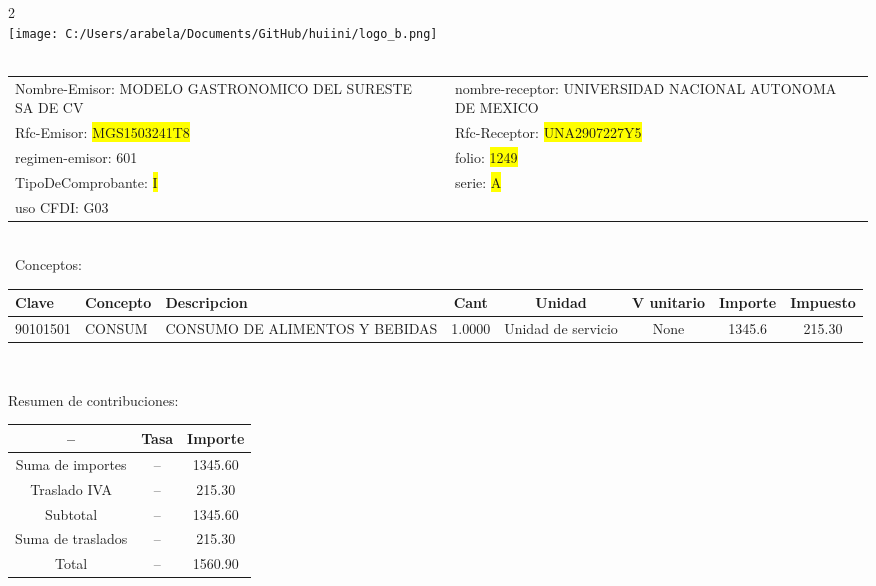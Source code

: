\documentclass{article}
\begin{document}
\hspace{18cm} 2\\
\texttt{[image: C:/Users/arabela/Documents/GitHub/huiini/logo\_b.png]}
\bigskip\\\
\begin{tabular}{p{11cm}p{1cm}p{8cm}}

Nombre-Emisor: MODELO GASTRONOMICO DEL SURESTE SA DE CV && nombre-receptor: UNIVERSIDAD NACIONAL AUTONOMA DE MEXICO\\

Rfc-Emisor: \colorbox{yellow}{ MGS1503241T8 } & & Rfc-Receptor: \colorbox{yellow}{ UNA2907227Y5 }\\

regimen-emisor: 601 & & folio: \colorbox{yellow}{ 1249 }\\

TipoDeComprobante: \colorbox{yellow}{ I } & & serie: \colorbox{yellow}{ A }\\

uso CFDI: G03\\



\end{tabular}
\bigskip\bigskip\bigskip\\\
Conceptos:\\
\begin{tabular}{|p{1.5cm}|p{3.6cm}|p{3.6cm}|c|c|c|c|c|}
\hline
Clave & Concepto & Descripcion & Cant & Unidad & V unitario & Importe & Impuesto \\
\hline

90101501 & CONSUM & CONSUMO DE ALIMENTOS Y BEBIDAS & 1.0000 & Unidad de servicio & None & 1345.6 &  215.30 \\
\hline

\end{tabular}\\
\bigskip
\begin{center}
Resumen de contribuciones:\\
\bigskip
\begin{tabular}{|c|c|c|}
\hline
 -- & Tasa & Importe\\
\hline

Suma de importes & -- & 1345.60 \\
\hline

Traslado IVA & -- & 215.30 \\
\hline

Subtotal  & -- & 1345.60 \\
\hline

Suma de traslados & -- & 215.30 \\
\hline

Total  & -- & 1560.90 \\
\hline

\end{tabular}
\end{center}
\end{document}
